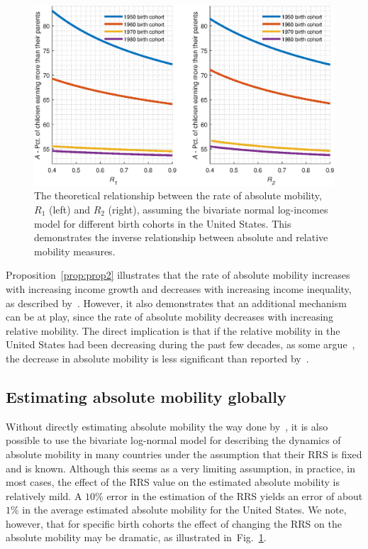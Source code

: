 \documentclass[12pt]{article}
\newcommand{\Pref}[1]{Proposition~\ref{prop:#1}}
\newcommand{\flabel}[1]{\label{fig:#1}}
\newcommand{\fref}[1]{Fig.~\ref{fig:#1}}
\numberwithin{equation}{section}
\begin{document}
\begin{figure}[!htb]
\centering
\includegraphics[width=1.0\textwidth] {./figs/R1_R2.eps}
\caption{The theoretical relationship between the rate of absolute mobility, $R_1$ (left) and $R_2$ (right), assuming the bivariate normal log-incomes model for different birth cohorts in the United States. This demonstrates the inverse relationship between absolute and relative mobility measures.}
\flabel{relat}
\end{figure}

\Pref{prop2} illustrates that the rate of absolute mobility increases with increasing income growth and decreases with increasing income inequality, as described by~\citet{chetty2017fading}. However, it also demonstrates that an additional mechanism can be at play, since the rate of absolute mobility decreases with increasing relative mobility. The direct implication is that if the relative mobility in the United States had been decreasing during the past few decades, as some argue~\citep{aaronson2008intergenerational,putnam2012growing}, the decrease in absolute mobility is less significant than reported by~\citet{chetty2017fading}.

\subsection{Estimating absolute mobility globally}

Without directly estimating absolute mobility the way done by~\citet{chetty2017fading}, it is also possible to use the bivariate log-normal model for describing the dynamics of absolute mobility in many countries under the assumption that their RRS is fixed and is known. Although this seems as a very limiting assumption, in practice, in most cases, the effect of the RRS value on the estimated absolute mobility is relatively mild. A $10\%$ error in the estimation of the RRS yields an error of about $1\%$ in the average estimated absolute mobility for the United States. We note, however, that for specific birth cohorts the effect of changing the RRS on the absolute mobility may be dramatic, as illustrated in~\fref{relat}.
\end{document}

